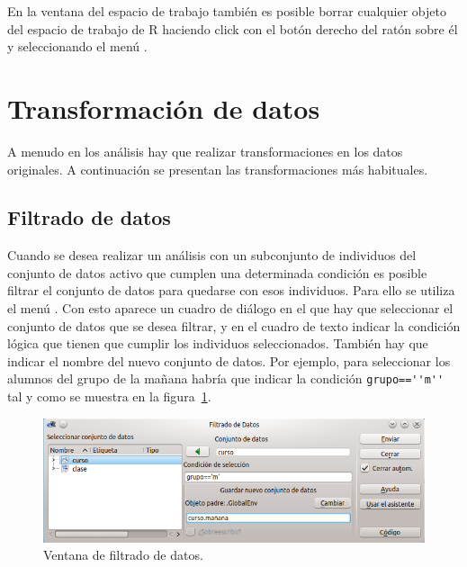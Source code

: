 En la ventana del espacio de trabajo también es posible borrar cualquier objeto del espacio de trabajo de R haciendo
click con el botón derecho del ratón sobre él y seleccionando el menú .


\section{Transformación de datos}
A menudo en los análisis hay que realizar transformaciones en los datos originales.
A continuación se presentan las transformaciones más habituales.


\subsection{Filtrado de datos}
Cuando se desea realizar un análisis con un subconjunto de individuos del conjunto de datos activo que cumplen una
determinada condición es posible filtrar el conjunto de datos para quedarse con esos individuos.
Para ello se utiliza el menú .
Con esto aparece un cuadro de diálogo en el que hay que seleccionar el conjunto de datos que se desea filtrar, y en el
cuadro de texto  indicar la condición lógica que tienen que cumplir los individuos
seleccionados.
También hay que indicar el nombre del nuevo conjunto de datos.
Por ejemplo, para seleccionar los alumnos del grupo de la mañana habría que indicar la condición
\lstinline{grupo==''m''} tal y como se muestra en la figura~\ref{g:filtrar_datos}.

\begin{figure}[htp]
\begin{center}
  \includegraphics[scale=0.6]{introduccion_r/img/filtrar}
  \caption{Ventana de filtrado de datos.}
  \label{g:filtrar_datos}
\end{center}
\end{figure}


